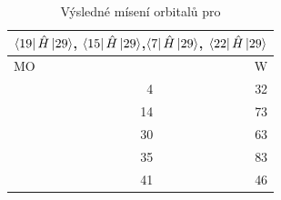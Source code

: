 \documentclass[
  digital, %
  table,   %
  lof,     %
  lot,     %
]{fithesis3}
\begin{document}
\begin{table}[htbp]
\caption{Výsledné mísení orbitalů pro  }
\begin{center}
\begin{tabular}{|r|r|}
\hline
\multicolumn{2}{|c|}{$\bra{19}{\hat{H}}\ket{29}$, $\bra{15}{\hat{H}}\ket{29}$,$\bra{7}{\hat{H}}\ket{29}$, $\bra{22}{\hat{H}}\ket{29}$} \\
\hline \hline
\multicolumn{1}{|l|}{MO} & \multicolumn{1}{r|}{W} \\ \hline
4 & 32 \\ \hline
14 & 73 \\ \hline
30 & 63 \\ \hline
35 & 83 \\ \hline
41 & 46 \\ \hline
\end{tabular}

\label{tab_sio3_vysledky}\end{center}
\end{table}
\end{document}
